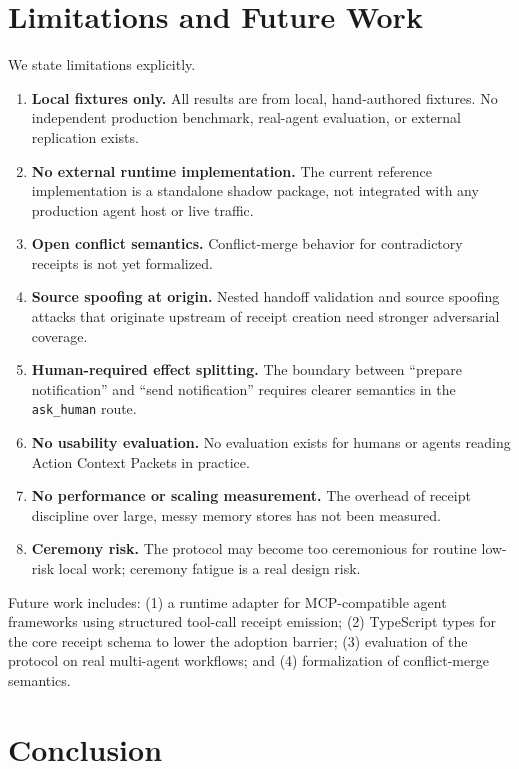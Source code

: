 \documentclass[11pt]{article}
\begin{document}
\section{Limitations and Future Work}
\label{sec:limitations}

We state limitations explicitly.

\begin{enumerate}
  \item \textbf{Local fixtures only.} All results are from local, hand-authored
    fixtures. No independent production benchmark, real-agent evaluation, or
    external replication exists.
  \item \textbf{No external runtime implementation.} The current reference
    implementation is a standalone shadow package, not integrated with any
    production agent host or live traffic.
  \item \textbf{Open conflict semantics.} Conflict-merge behavior for contradictory
    receipts is not yet formalized.
  \item \textbf{Source spoofing at origin.} Nested handoff validation and
    source spoofing attacks that originate upstream of receipt creation need
    stronger adversarial coverage.
  \item \textbf{Human-required effect splitting.} The boundary between ``prepare
    notification'' and ``send notification'' requires clearer semantics in the
    \texttt{ask\_human} route.
  \item \textbf{No usability evaluation.} No evaluation exists for humans or agents
    reading Action Context Packets in practice.
  \item \textbf{No performance or scaling measurement.} The overhead of receipt
    discipline over large, messy memory stores has not been measured.
  \item \textbf{Ceremony risk.} The protocol may become too ceremonious for routine
    low-risk local work; ceremony fatigue is a real design risk.
\end{enumerate}

Future work includes: (1) a runtime adapter for MCP-compatible agent frameworks
using structured tool-call receipt emission; (2) TypeScript types for the core
receipt schema to lower the adoption barrier; (3) evaluation of the protocol on
real multi-agent workflows; and (4) formalization of conflict-merge semantics.

\section{Conclusion}
\label{sec:conclusion}
\end{document}
